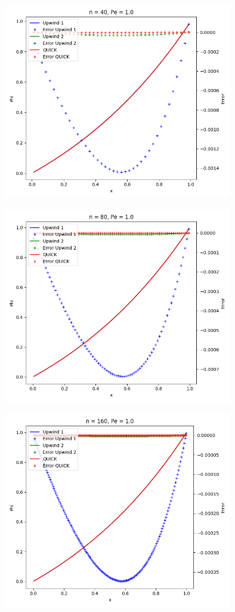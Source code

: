 \documentclass[11pt]{article}
\begin{document}
\begin{center}
\includegraphics[width=10cm]{./figures/n40pe1.png}
\end{center}

\begin{center}
\includegraphics[width=10cm]{./figures/n80pe1.png}
\end{center}

\begin{center}
\includegraphics[width=10cm]{./figures/n160pe1.png}
\end{center}
\end{document}
